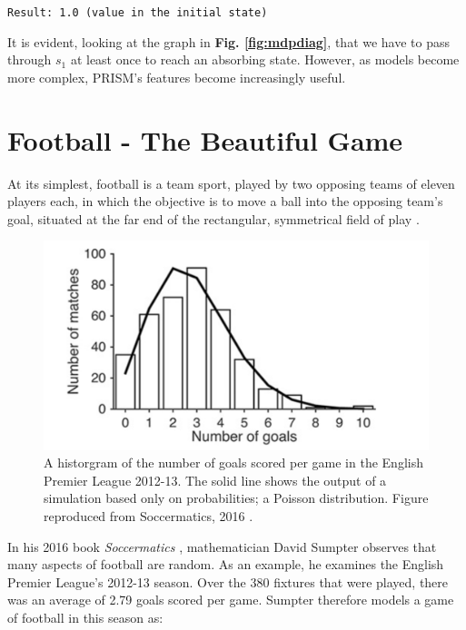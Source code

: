 \documentclass{l4proj}
\begin{document}
\begin{center}
    \texttt{Result: 1.0 (value in the initial state)}    
\end{center}

It is evident, looking at the graph in \textbf{Fig. \ref{fig:mdpdiag}}, that we have to pass through $s_1$ at least once to reach an absorbing state. However, as models become more complex, PRISM's features become increasingly useful.

\section{Football - The Beautiful Game}

At its simplest, football is a team sport, played by two opposing teams of eleven players each, in which the objective is to move a ball into the opposing team's goal, situated at the far end of the rectangular, symmetrical field of play \cite{ifab1}.

\begin{figure}[h]
    \centering
    \includegraphics[scale=0.4]{images/pois1.png}   
    \caption{A historgram of the number of goals scored per game in the English Premier League 2012-13. The solid line shows the output of a simulation based only on probabilities; a Poisson distribution. Figure reproduced from Soccermatics, 2016 \cite{sump1}.}
    \label{fig:pois} 
\end{figure}

In his 2016 book \textit{Soccermatics} \cite{sump1}, mathematician David Sumpter observes that many aspects of football are random. As an example, he examines the English Premier League's 2012-13 season. Over the 380 fixtures that were played, there was an average of 2.79 goals scored per game. Sumpter therefore models a game of football in this season as:
\end{document}
